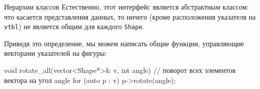 \documentclass[
    8pt,
    hyperref={pdfencoding=unicode}
    ]{beamer}
\theoremstyle{definition}
\begin{document}
\begin{frame}{Иерархии классов}
    Естественно, этот интерфейс является абстрактным классом: что касается представления данных,
    то ничего (кроме расположения указателя на \texttt{vtbl}) не является общим для каждого \texttt{Shape}. 
    
    Приведя это определение, мы можем написать общие функции, управляющие векторами указателей на фигуры:
    
    \begin{cppcode}
        void rotate_all(vector<Shape*>& v, int angle) // поворот всех элементов вектора на угол angle
        {
            for (auto p : v)
            p->rotate(angle);
        }
    \end{cppcode}

    
   
    
\end{frame}
\end{document}
